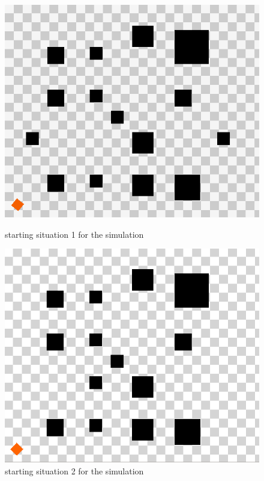 \documentclass[conference]{IEEEtran}
\begin{document}
\begin{figure}[!ht]
  \centering
  \includegraphics[scale=0.3]{./figs/StartSetup.png}
  \caption{starting situation 1 for the simulation}
  \label{fig:start1}
  \includegraphics[scale=0.3]{./figs/StartSetup2.png}
  \caption{starting situation 2 for the simulation}
  \label{fig:start2}
\end{figure}
\end{document}
